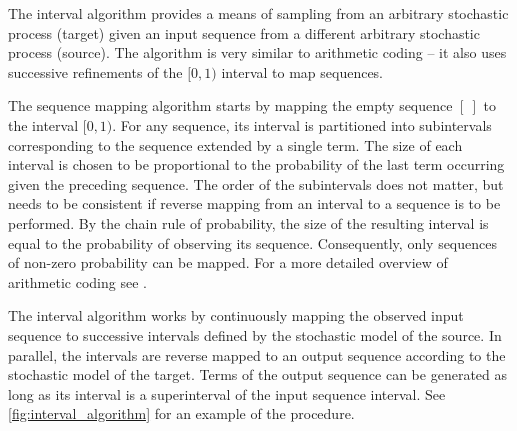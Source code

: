 \documentclass[draft]{IIBproject}
\begin{document}
The interval algorithm \cite{hanhoshi1997} provides a means of sampling from an arbitrary stochastic process (target) given an input sequence from a different arbitrary stochastic process (source). The algorithm is very similar to arithmetic coding -- it also uses successive refinements of the $[0,1)$ interval to map sequences.

The sequence mapping algorithm starts by mapping the empty sequence $[~]$ to the interval $[0,1)$. For any sequence, its interval is partitioned into subintervals corresponding to the sequence extended by a single term. The size of each interval is chosen to be proportional to the probability of the last term occurring given the preceding sequence. The order of the subintervals does not matter, but needs to be consistent if reverse mapping from an interval to a sequence is to be performed. By the chain rule of probability, the size of the resulting interval is equal to the probability of observing its sequence. Consequently, only sequences of non-zero probability can be mapped. For a more detailed overview of arithmetic coding see \cite{coverthomas:sfecoding}.

The interval algorithm works by continuously mapping the observed input sequence to successive intervals defined by the stochastic model of the source. In parallel, the intervals are reverse mapped to an output sequence according to the stochastic model of the target. Terms of the output sequence can be generated as long as its interval is a superinterval of the input sequence interval. See \cref{fig:interval_algorithm} for an example of the procedure.
\end{document}
